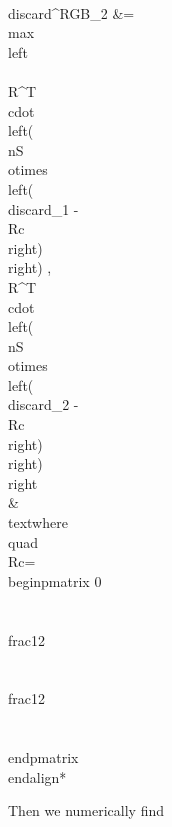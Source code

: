 \\discard^{RGB}_2 &= \\max \\left\\{ 
  \\R^{T} \\cdot \\left( \\nS \\otimes \\left( \\discard_1 - \\Rc \\right) \\right) , 
  \\R^{T} \\cdot \\left( \\nS \\otimes \\left( \\discard_2 - \\Rc \\right) \\right) 
\\right\\} &
 \\text{where} \\quad \\Rc=
\\begin{pmatrix}
                 0   \\\\
                 \\frac{1}{2}    \\\\
                 \\frac{1}{2}     \\\\
\\end{pmatrix} 
\\end{align*}

Then we numerically find 

